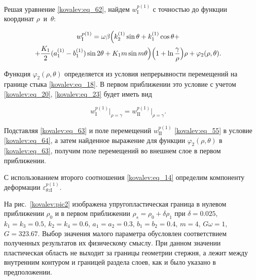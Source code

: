 Решая уравнение \eqref{kovalev:eq_62}, найдем $w_{\mathrm{I}}^{p(1)}$  с точностью до функции координат $\rho$~и~$\theta$:

 \begin{multline}

\label{kovalev:eq_63}

  w_{\mathrm{I}}^{p(1)}=

  \omega\beta

  \Bigl(k_2^{(1)} \sin\theta + k_1^{(1)} \cos\theta + \\ +

  \frac{K_1}{2} (a_1^{(1)}-b_1^{(1)})\sin2\theta+

  K_1 m\sin m\theta \Bigr) \Bigl(1+\ln\frac{\gamma}{\rho}\Bigr)\rho+\varphi_2(\rho,\theta).

 \end{multline}

 

 \pagebreak



Функция $\varphi_2(\rho,\theta)$ определяется из условия непрерывности перемещений на границе стыка \eqref{kovalev:eq_18}. В первом приближении это условие с учетом \eqref{kovalev:eq_20}, \eqref{kovalev:eq_23} будет иметь вид

 \begin{equation}

\label{kovalev:eq_64}

w_{\mathrm{I}}^{p(1)}\bigr|_{\rho=\gamma}= w_{\mathrm{II}}^{p(1)}\bigr|_{\rho=\gamma}.

 \end{equation}



Подставляя \eqref{kovalev:eq_63} и поле перемещений $w_{\mathrm{II}}^{p(1)}$ \eqref{kovalev:eq_55} в условие \eqref{kovalev:eq_64}, а затем найденное выражение для функции $\varphi_2(\rho,\theta)$ в \eqref{kovalev:eq_63}, получим поле перемещений во внешнем слое в первом приближении. 

С использованием второго соотношения \eqref{kovalev:eq_14} определим компоненту деформации $\varepsilon_{\theta z\mathrm{I}}^{p(1)}$.



На рис.~\ref{kovalev:pic2} изображена упругопластическая граница в нулевом приближении $\rho_0$ и в первом приближении $\rho_s=\rho_0+\delta\rho_1$ при $\delta=0.025$, $k_1=k_3=0.5$, $k_2=k_4=0.6$, $a_1=a_2=0.3$, $b_1=b_2=0.4$, $m=4$, $G\omega=1$, $G=323.67$. Выбор значения малого параметра обусловлен соответствием полученных результатов их физическому смыслу. При данном значении пластическая область не выходит за границы геометрии стержня, а лежит между внутренним контуром и границей раздела слоев, как и было указано в предположении.



